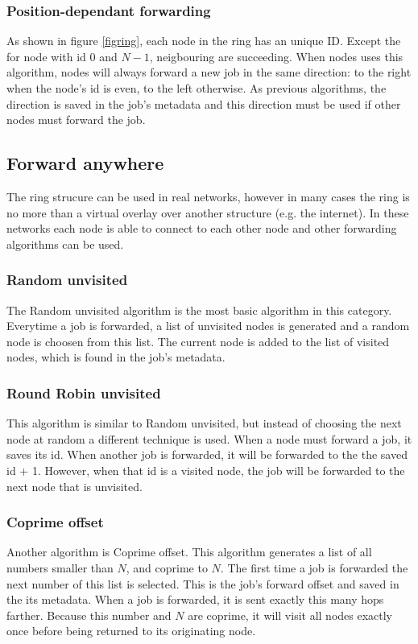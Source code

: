 \documentclass[10pt,a4paper,titlepage]{article}
\begin{document}
\subsubsection{Position-dependant forwarding}
As shown in figure \ref{figring}, each node in the ring has an unique ID. Except the for node with id $0$ and $N-1$, neigbouring are succeeding. When nodes uses this algorithm, nodes will always forward a new job in the same direction: to the right when the node's id is even, to the left otherwise. As previous algorithms, the direction is saved in the job's metadata and this direction must be used if other nodes must forward the job.

\subsection{Forward anywhere}
The ring strucure can be used in real networks, however in many cases the ring is no more than a virtual overlay over another structure (e.g. the internet). In these networks each node is able to connect to each other node and other forwarding algorithms can be used.

\subsubsection{Random unvisited}
The Random unvisited algorithm is the most basic algorithm in this category. Everytime a job is forwarded, a list of unvisited nodes is generated and a random node is choosen from this list. The current node is added to the list of visited nodes, which is found in the job's metadata.

\subsubsection{Round Robin unvisited}
This algorithm is similar to Random unvisited, but instead of choosing the next node at random a different technique is used. When a node must forward a job, it saves its id. When another job is forwarded, it will be forwarded to the the saved id + 1. However, when that id is a visited node, the job will be forwarded to the next node that is unvisited.

\subsubsection{Coprime offset}
Another algorithm is Coprime offset. This algorithm generates a list of all numbers smaller than $N$, and coprime to $N$. The first time a job is forwarded the next number of this list is selected. This is the job's forward offset and saved in the its metadata. When a job is forwarded, it is sent exactly this many hops farther. Because this number and $N$ are coprime, it will visit all nodes exactly once before being returned to its originating node. 
\end{document}
